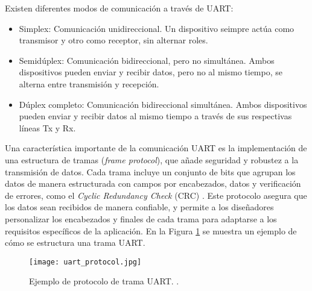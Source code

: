 Existen diferentes modos de comunicación a través de UART:
\begin{itemize}
	\item Simplex: Comunicación unidireccional. Un dispositivo seimpre actúa como transmisor y otro como receptor, sin alternar roles.
	\item Semidúplex: Comunicación bidireccional, pero no simultánea. Ambos dispositivos pueden enviar y recibir datos, pero no al mismo tiempo, se alterna entre transmisión y recepción.
	\item Dúplex completo: Comunicación bidireccional simultánea. Ambos dispositivos pueden enviar y recibir datos al mismo tiempo a través de sus respectivas líneas Tx y Rx.
\end{itemize}

Una característica importante de la comunicación UART es la implementación de una estructura de tramas (\textit{frame protocol}), que añade seguridad y robustez a la transmisión de datos. Cada trama incluye un conjunto de bits que agrupan los datos de manera estructurada con campos por encabezados, datos y verificación de errores, como el \textit{Cyclic Redundancy Check} (CRC) \cite{pena_uart_nodate}. Este protocolo asegura que los datos sean recibidos de manera confiable, y permite a los diseñadores personalizar los encabezados y finales de cada trama para adaptarse a los requisitos específicos de la aplicación. En la Figura \ref{fig:uart_frame} se muestra un ejemplo de cómo se estructura una trama UART.

\begin{figure}[H]
	\centering
	\texttt{[image: uart\_protocol.jpg]}
	\caption{Ejemplo de protocolo de trama UART. \cite{pena_uart_nodate}.}
	\label{fig:uart_frame}
\end{figure}